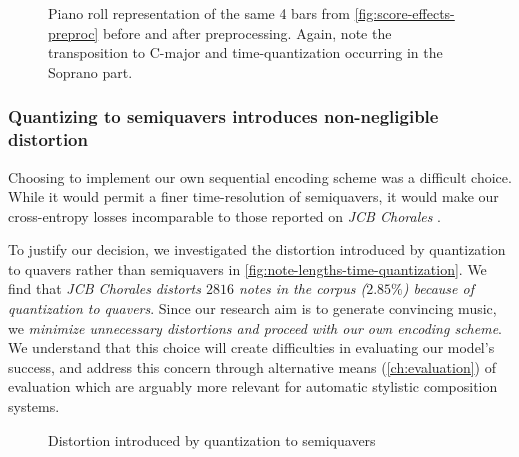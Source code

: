 
\begin{figure}[tb]
    \centering
        
        
    \caption{Piano roll representation of the same 4 bars from \cref{fig:score-effects-preproc}
      before and after preprocessing. Again, note the transposition to C-major
      and time-quantization occurring in the Soprano part.}
    \label{fig:piano-roll-effects-preproc}
\end{figure}

\subsubsection{Quantizing to semiquavers introduces non-negligible distortion}\label{sec:jcb-distorts}

Choosing to implement our own sequential encoding scheme was a difficult choice.
While it would permit a finer time-resolution of semiquavers, it would make
our cross-entropy losses incomparable to those reported on \textit{JCB
Chorales} \citep{Allan2005}.

To justify our decision, we investigated the distortion introduced by
quantization to quavers rather than semiquavers in
\vref{fig:note-lengths-time-quantization}. We find that \textit{JCB Chorales}
\emph{distorts $2816$ notes in the corpus ($2.85\%$) because of quantization to
quavers}. Since our research aim is to generate convincing music, we
\emph{minimize unnecessary distortions and proceed with our own encoding
scheme}. We understand that this choice will create difficulties in evaluating
our model's success, and address this concern through alternative means (\cref{ch:evaluation})
of evaluation which are arguably more relevant for automatic stylistic composition systems.

\begin{figure}[tb]
    \centering
    \begin{subfigure}[t]{0.48\textwidth}
        \centering
        
    \end{subfigure}
    \begin{subfigure}[t]{0.48\textwidth}
        \centering
        
    \end{subfigure}
    \caption{Distortion introduced by quantization to semiquavers}
    \label{fig:note-lengths-time-quantization}
\end{figure}


